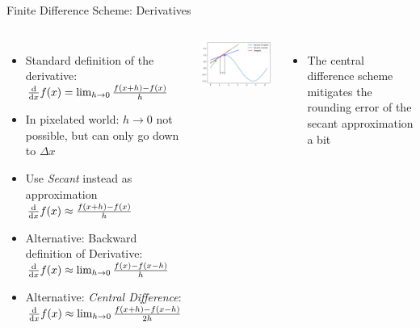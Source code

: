 \begin{frame}{Finite Difference Scheme: Derivatives}
%
\begin{columns}[t]
\begin{itemize}
\item Standard definition of the derivative:\\
	$ \dv{x}f(x) = \lim_{h \to 0}\frac{f(x + h) - f(x)}{h} $
\item In pixelated world: $h \to 0$ not possible, but can only go down to $\Delta x$
\item Use \emph{Secant} instead as approximation\\
	$ \dv{x}f(x) \approx \frac{f(x + h) - f(x)}{h} $
\item Alternative: Backward definition of Derivative:\\
	$ \dv{x}f(x) \approx \lim_{h \to 0}\frac{f(x) - f(x - h)}{h} $
\item Alternative: \emph{Central Difference}:\\
	$ \dv{x}f(x) \approx \lim_{h \to 0}\frac{f(x + h) - f(x - h)}{2h} $
\end{itemize}
%
\begin{center}
	\includegraphics[width=\linewidth]{./gfx/SecantAndTangent}
\end{center}
%
\begin{itemize}
\item The central difference scheme mitigates the rounding error of the secant approximation a bit
\end{itemize}
\end{columns}
%
\end{frame}


